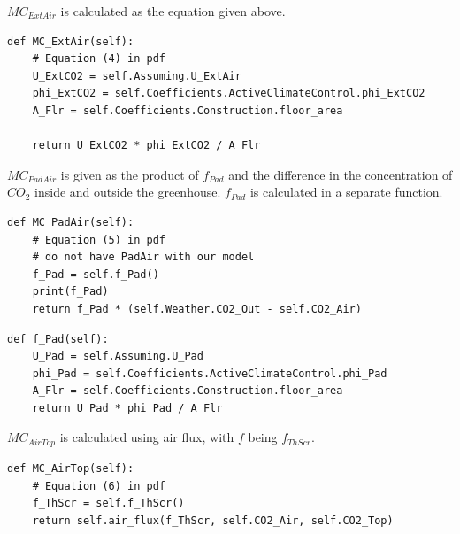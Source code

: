 \documentclass[a4paper]{article}
\begin{document}
\(MC_{ExtAir}\) is calculated as the equation given above.
\begin{mdframed}[leftline=false,rightline=false,backgroundcolor=magenta!10]
  \begin{verbatim}
def MC_ExtAir(self):
    # Equation (4) in pdf
    U_ExtCO2 = self.Assuming.U_ExtAir
    phi_ExtCO2 = self.Coefficients.ActiveClimateControl.phi_ExtCO2
    A_Flr = self.Coefficients.Construction.floor_area

    return U_ExtCO2 * phi_ExtCO2 / A_Flr
  \end{verbatim}
\end{mdframed}

\(MC_{PadAir}\) is given as the product of \(f_{Pad}\) and the difference in the concentration of \(CO_2\) inside and outside the greenhouse.
\(f_{Pad}\) is calculated in a separate function.
\begin{mdframed}[leftline=false,rightline=false,backgroundcolor=magenta!10]
  \begin{verbatim}
def MC_PadAir(self):
    # Equation (5) in pdf
    # do not have PadAir with our model
    f_Pad = self.f_Pad()
    print(f_Pad)
    return f_Pad * (self.Weather.CO2_Out - self.CO2_Air)
  \end{verbatim}
\end{mdframed}

\begin{mdframed}[leftline=false,rightline=false,backgroundcolor=magenta!10]
  \begin{verbatim}
def f_Pad(self):
    U_Pad = self.Assuming.U_Pad
    phi_Pad = self.Coefficients.ActiveClimateControl.phi_Pad
    A_Flr = self.Coefficients.Construction.floor_area
    return U_Pad * phi_Pad / A_Flr
  \end{verbatim}
\end{mdframed}

\(MC_{AirTop}\) is calculated using air flux, with \(f\) being \(f_{ThScr}\).
\begin{mdframed}[leftline=false,rightline=false,backgroundcolor=magenta!10]
  \begin{verbatim}
def MC_AirTop(self):
    # Equation (6) in pdf
    f_ThScr = self.f_ThScr()
    return self.air_flux(f_ThScr, self.CO2_Air, self.CO2_Top)
  \end{verbatim}
\end{mdframed}
\end{document}
